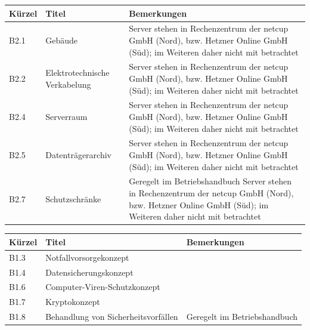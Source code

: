 \begin{minipage}{\textwidth}
\begin{center}
\begin{tabular}{p{1cm}p{5cm}p{9cm}}
\toprule
Kürzel 	& Titel & Bemerkungen \\
\midrule
B2.1 	& Gebäude & Server stehen in Rechenzentrum der netcup GmbH (Nord), bzw. Hetzner Online GmbH (Süd); im Weiteren daher nicht mit betrachtet \\
B2.2 	& Elektrotechnische \newline Verkabelung & Server stehen in Rechenzentrum der netcup GmbH (Nord), bzw. Hetzner Online GmbH (Süd); im Weiteren daher nicht mit betrachtet \\
B2.4 	& Serverraum & Server stehen in Rechenzentrum der netcup GmbH (Nord), bzw. Hetzner Online GmbH (Süd); im Weiteren daher nicht mit betrachtet \\
B2.5 	& Datenträgerarchiv	& Server stehen in Rechenzentrum der netcup GmbH (Nord), bzw. Hetzner Online GmbH (Süd); im Weiteren daher nicht mit betrachtet \\
B2.7 	& Schutzschränke & Geregelt im Betriebshandbuch Server stehen in Rechenzentrum der netcup GmbH (Nord), bzw. Hetzner Online GmbH (Süd); im Weiteren daher nicht mit betrachtet \\
\bottomrule
\end{tabular}
\end{center}
\end{minipage}
\bigskip

\begin{minipage}{\textwidth}
\begin{center}
\begin{tabular}{p{1cm}p{5cm}p{9cm}}
\toprule
Kürzel 	& Titel & Bemerkungen \\
\midrule
B1.3 	& Notfallvorsorgekonzept & \\
B1.4 	& Datensicherungskonzept & \\
B1.6 	& Computer-Viren-Schutzkonzept & \\
B1.7 	& Kryptokonzept	& \\
B1.8 	& Behandlung von \newline Sicherheitsvorfällen & Geregelt im Betriebshandbuch \\
\bottomrule
\end{tabular}
\end{center}
\end{minipage}
\bigskip

